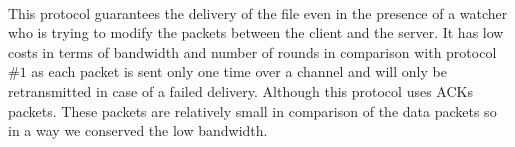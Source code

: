 \documentclass[main.tex]{subfiles}
\begin{document}
\begin{comment}
\paragraph{}
Then we have packet of type $4$ that contains:
\begin{center}
\begin{tabu} to 0.9\textwidth { | X[c]  | X[c]  | X[c]  | }
 \hline
Hash & Op Code = 4 & seq = -1 \\
\hline
\end{tabu}\\
\end{center}
We call this packet the "Data Packet Acknowledgment", This packet type is sent from the server to the client. Its job is to notify the client that the packet which was sent on this channel was NOT delivered correctly. When the client receives this packet type it will:
\begin{itemize}
\item Calculate the hash of the data $($opCode and seq $= -1)$.
\item Compare the calculated hash with the received hash.
\item Extract the sequence number from the packet data.
\item Find out that the sequence number $= -1$.
\item Extract the sequence number that was sent over this channel from the cashe.
\item Find the next available channel in the channel pool.
\item Retransmit the packet again over the next available channel. 
\item Add the channel to the pool of available channels again.
\end{itemize}
This ACK packet is sent for every packet that was NOT successfully received by the server.
\end{comment}
\paragraph{}
This protocol guarantees the delivery of the file even in the presence of a watcher who is trying to modify the packets between the client and the server. It has low costs in terms of bandwidth and number of rounds in comparison with protocol $\#1$ as each packet is sent only one time over a channel and will only be retransmitted in case of a failed delivery. Although this protocol uses ACKs packets. These packets are relatively small in comparison of the data packets so in a way we conserved the low bandwidth.
\end{document}
